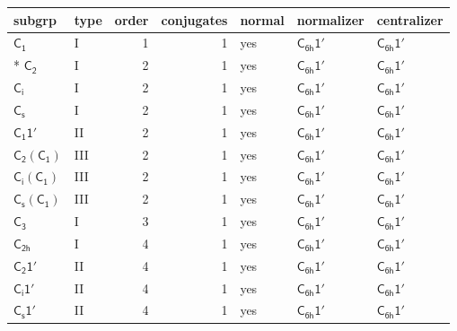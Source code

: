 \documentclass[10pt,a4paper]{article}
\numberwithin{equation}{section}
\newcommand{\grp}[1]{\mathsf{#1}}
\begin{document}
{\small\begin{longtable}{@{}llrrlll@{}}\toprule
subgrp & type & order & conjugates & normal & normalizer & centralizer\\\midrule\endhead
\bottomrule\endfoot\endlastfoot
\href{../../../rotation/data/pdf/C1.pdf}{$\grp{C_{1}}$} & I & 1 & 1 & yes & \href{C6h-1p.pdf}{$\grp{C_{6h}1'}$} & \href{C6h-1p.pdf}{$\grp{C_{6h}1'}$}\\*
\href{../../../rotation/data/pdf/C2.pdf}{$\grp{C_{2}}$} & I & 2 & 1 & yes & \href{C6h-1p.pdf}{$\grp{C_{6h}1'}$} & \href{C6h-1p.pdf}{$\grp{C_{6h}1'}$}\\
\href{../../../rotation/data/pdf/S2.pdf}{$\grp{C_{i}}$} & I & 2 & 1 & yes & \href{C6h-1p.pdf}{$\grp{C_{6h}1'}$} & \href{C6h-1p.pdf}{$\grp{C_{6h}1'}$}\\
\href{../../../rotation/data/pdf/C1v.pdf}{$\grp{C_{s}}$} & I & 2 & 1 & yes & \href{C6h-1p.pdf}{$\grp{C_{6h}1'}$} & \href{C6h-1p.pdf}{$\grp{C_{6h}1'}$}\\
\href{C1-1p.pdf}{$\grp{C_{1}1'}$} & II & 2 & 1 & yes & \href{C6h-1p.pdf}{$\grp{C_{6h}1'}$} & \href{C6h-1p.pdf}{$\grp{C_{6h}1'}$}\\
\href{C2-C1.pdf}{$\grp{C_{2}}(\grp{C_{1}})$} & III & 2 & 1 & yes & \href{C6h-1p.pdf}{$\grp{C_{6h}1'}$} & \href{C6h-1p.pdf}{$\grp{C_{6h}1'}$}\\
\href{S2-C1.pdf}{$\grp{C_{i}}(\grp{C_{1}})$} & III & 2 & 1 & yes & \href{C6h-1p.pdf}{$\grp{C_{6h}1'}$} & \href{C6h-1p.pdf}{$\grp{C_{6h}1'}$}\\
\href{C1v-C1.pdf}{$\grp{C_{s}}(\grp{C_{1}})$} & III & 2 & 1 & yes & \href{C6h-1p.pdf}{$\grp{C_{6h}1'}$} & \href{C6h-1p.pdf}{$\grp{C_{6h}1'}$}\\
\href{../../../rotation/data/pdf/C3.pdf}{$\grp{C_{3}}$} & I & 3 & 1 & yes & \href{C6h-1p.pdf}{$\grp{C_{6h}1'}$} & \href{C6h-1p.pdf}{$\grp{C_{6h}1'}$}\\
\href{../../../rotation/data/pdf/C2h.pdf}{$\grp{C_{2h}}$} & I & 4 & 1 & yes & \href{C6h-1p.pdf}{$\grp{C_{6h}1'}$} & \href{C6h-1p.pdf}{$\grp{C_{6h}1'}$}\\
\href{C2-1p.pdf}{$\grp{C_{2}1'}$} & II & 4 & 1 & yes & \href{C6h-1p.pdf}{$\grp{C_{6h}1'}$} & \href{C6h-1p.pdf}{$\grp{C_{6h}1'}$}\\
\href{S2-1p.pdf}{$\grp{C_{i}1'}$} & II & 4 & 1 & yes & \href{C6h-1p.pdf}{$\grp{C_{6h}1'}$} & \href{C6h-1p.pdf}{$\grp{C_{6h}1'}$}\\
\href{C1v-1p.pdf}{$\grp{C_{s}1'}$} & II & 4 & 1 & yes & \href{C6h-1p.pdf}{$\grp{C_{6h}1'}$} & \href{C6h-1p.pdf}{$\grp{C_{6h}1'}$}\\

\end{longtable}}
\end{document}
